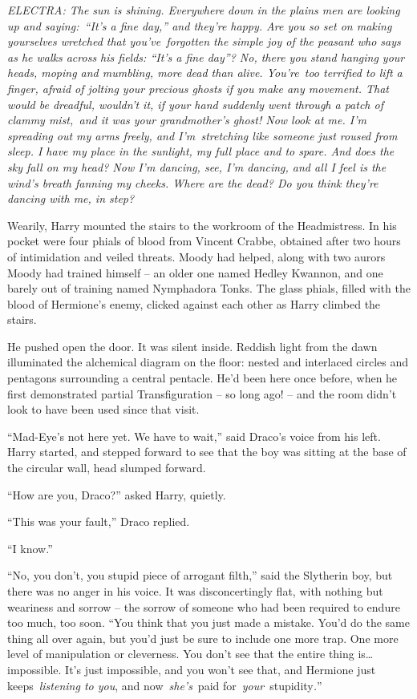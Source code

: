 \emph{ELECTRA: The sun is shining. Everywhere down in the plains men are
looking up and saying:~``It's a fine day,'' and they're happy. Are you
so set on making yourselves wretched that you've~forgotten the simple
joy of the peasant who says as he walks across his fields: ``It's a fine
day''? No, there you stand hanging your heads, moping and mumbling, more
dead than alive. You're~too terrified to lift a finger, afraid of
jolting your precious ghosts if you make any movement. That would be
dreadful, wouldn't it, if your hand suddenly went through a patch of
clammy mist,~and it was your grandmother's ghost! Now look at me. I'm
spreading out my arms freely, and I'm~stretching like someone just
roused from sleep. I have my place in the sunlight, my full place and to
spare. And does the sky fall on my head? Now I'm dancing, see, I'm
dancing, and all I feel is the wind's breath fanning my cheeks. Where
are the dead? Do you think they're dancing with me, in step?}~


\mybreak

Wearily, Harry mounted the stairs to the workroom of the Headmistress.
In his pocket were four phials of blood from Vincent Crabbe, obtained
after two hours of intimidation and veiled threats. Moody had helped,
along with two aurors Moody had trained himself -- an older one named
Hedley Kwannon, and one barely out of training named Nymphadora Tonks.
The glass phials, filled with the blood of Hermione's enemy, clicked
against each other as Harry climbed the stairs.

He pushed open the door. It was silent inside. Reddish light from the
dawn illuminated the alchemical diagram on the floor: nested and
interlaced circles and pentagons surrounding a central pentacle. He'd
been here once before, when he first demonstrated partial
Transfiguration -- so long ago! -- and the room didn't look to have been
used since that visit.

``Mad-Eye's not here yet. We have to wait,'' said Draco's voice from his
left. Harry started, and stepped forward to see that the boy was sitting
at the base of the circular wall, head slumped forward.

``How are you, Draco?'' asked Harry, quietly.

``This was your fault,'' Draco replied.

``I know.''

``No, you don't, you stupid piece of arrogant filth,'' said the
Slytherin boy, but there was no anger in his voice. It was
disconcertingly flat, with nothing but weariness and sorrow -- the
sorrow of someone who had been required to endure too much, too soon.
``You think that you just made a mistake. You'd do the same thing all
over again, but you'd just be sure to include one more trap. One more
level of manipulation or cleverness. You don't see that the entire thing
is\ldots{} impossible. It's just impossible, and you won't see that, and
Hermione just keeps~\emph{listening to you}, and now~\emph{she's}~paid
for~\emph{your}~stupidity\emph{.}''

